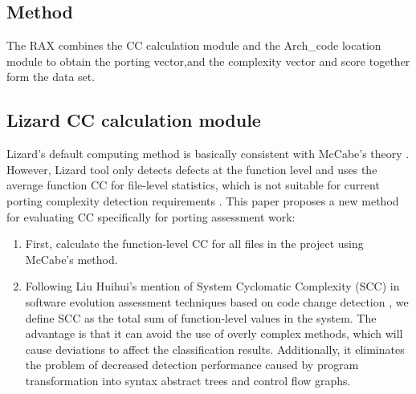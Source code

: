 \documentclass[sigconf,screen,review]{acmart}
\begin{document}
\subsection{Method}
\label{sec:method}
The RAX combines the CC calculation module and the Arch\_code location module to obtain the porting vector,and the complexity vector and score together form the data set.

\subsection{Lizard CC calculation module}
Lizard's default computing method is basically consistent with McCabe's theory \cite{1702388}.
However, Lizard tool only detects defects at the function level and uses the average function CC for file-level statistics, which is not suitable for current porting complexity detection requirements \cite{9402593}.
This paper proposes a new method for evaluating CC specifically for porting assessment work:
\begin{enumerate}
  \item First, calculate the function-level CC for all files in the project using McCabe's method.
  \item Following Liu Huihui's mention of System Cyclomatic Complexity (SCC) in software evolution assessment techniques based on code change detection \cite{liuhuihui00}, we define SCC as the total sum of function-level values in the system.
  The advantage is that it can avoid the use of overly complex methods, which will cause deviations to affect the classification results.
  Additionally, it eliminates the problem of decreased detection performance caused by program transformation into syntax abstract trees and control flow graphs.
\end{enumerate}
\end{document}
